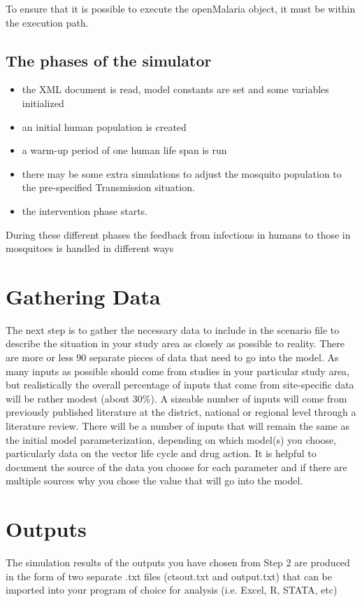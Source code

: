 \documentclass[]{scrartcl}
\begin{document}
To ensure that it is possible to execute the openMalaria object, it must be within 
the execution path. 

\subsection{The phases of the simulator}
\begin{itemize}
\item the XML document is read, model constants are set and some variables initialized
\item an initial human population is created
\item a warm-up period of one human life span is run
\item there may be some extra simulations to adjust the mosquito population to the pre-specified Transmission situation.
\item the intervention phase starts.
\end{itemize}
During these different phases the feedback from infections in humans to those in mosquitoes is handled in different ways

\section{Gathering Data}

The next step is to gather the necessary data to include in the scenario file to describe the situation in your study area as closely as possible to reality. There are more or less 90 separate pieces of data that need to go into the model. As many inputs as possible should come from studies in your particular study area, but realistically the overall percentage of inputs that come from site-specific data will be rather modest (about 30\%). A sizeable number of inputs will come from previously published literature at the district, national or regional level through a literature review. There will be a number of inputs that will remain the same as the initial model parameterization, depending on which model(s) you choose, particularly data on the vector life cycle and drug action. It is helpful to document the source of the data you choose for each parameter and if there are multiple sources why you chose the value that will go into the model.

\section{Outputs}
The simulation results of the outputs you have chosen from Step 2 are produced in the form of two separate .txt files (ctsout.txt and output.txt) that can be imported into your program of choice for analysis (i.e. Excel, R, STATA, etc)
\end{document}

